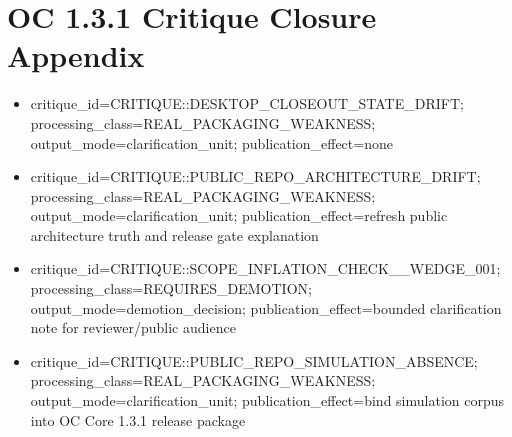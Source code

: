 \section{OC 1.3.1 Critique Closure Appendix}
\begin{itemize}[leftmargin=*]
\item critique\_id=CRITIQUE::DESKTOP\_CLOSEOUT\_STATE\_DRIFT; processing\_class=REAL\_PACKAGING\_WEAKNESS; output\_mode=clarification\_unit; publication\_effect=none
\item critique\_id=CRITIQUE::PUBLIC\_REPO\_ARCHITECTURE\_DRIFT; processing\_class=REAL\_PACKAGING\_WEAKNESS; output\_mode=clarification\_unit; publication\_effect=refresh public architecture truth and release gate explanation
\item critique\_id=CRITIQUE::SCOPE\_INFLATION\_CHECK\_\_WEDGE\_001; processing\_class=REQUIRES\_DEMOTION; output\_mode=demotion\_decision; publication\_effect=bounded clarification note for reviewer/public audience
\item critique\_id=CRITIQUE::PUBLIC\_REPO\_SIMULATION\_ABSENCE; processing\_class=REAL\_PACKAGING\_WEAKNESS; output\_mode=clarification\_unit; publication\_effect=bind simulation corpus into OC Core 1.3.1 release package
\end{itemize}
